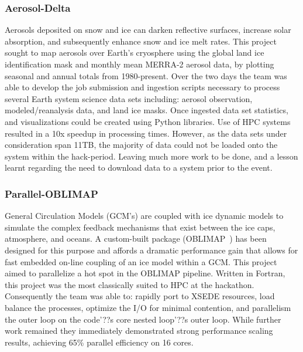 \documentclass[conference]{IEEEtran}
\begin{document}
\subsubsection{Aerosol-Delta}
Aerosols deposited on snow and ice can darken reflective surfaces, increase solar absorption, and subsequently enhance snow and ice melt rates. This project sought to map aerosols over Earth's cryosphere using the global land ice identification mask and monthly mean MERRA-2 aerosol data, by plotting seasonal and annual totals from 1980-present. Over the two days the team was able to develop the job submission and ingestion scripts necessary to process several Earth system science data sets including: aerosol observation, modeled/reanalysis data, and land ice masks.  Once ingested data set statistics, and visualizations could be created using Python libraries.  Use of HPC systems resulted in a 10x speedup in processing times.  However, as the data sets under consideration span 11TB, the majority of data could not be loaded onto the system within the hack-period. Leaving much more work to be done, and a lesson learnt regarding the need to download data to a system prior to the event.
\subsubsection{Parallel-OBLIMAP}
General Circulation Models (GCM's) are coupled with ice dynamic models to simulate the complex feedback mechanisms that exist between the ice caps, atmosphere, and oceans. A custom-built package (OBLIMAP~\cite{Reerink2016-xr}) has been designed for this purpose and affords a dramatic performance gain that allows for fast embedded on-line coupling of an ice model within a GCM. This project aimed to parallelize a hot spot in the OBLIMAP pipeline.  Written in Fortran, this project was the most classically suited to HPC at the hackathon.  Consequently the team was able to: rapidly port to XSEDE resources, load balance the processes, optimize the I/O for minimal contention, and parallelism the outer loop on the code'??s core nested loop'??s outer loop.  While further work remained they immediately demonstrated strong performance scaling results, achieving 65\% parallel efficiency on 16 cores.
\end{document}
